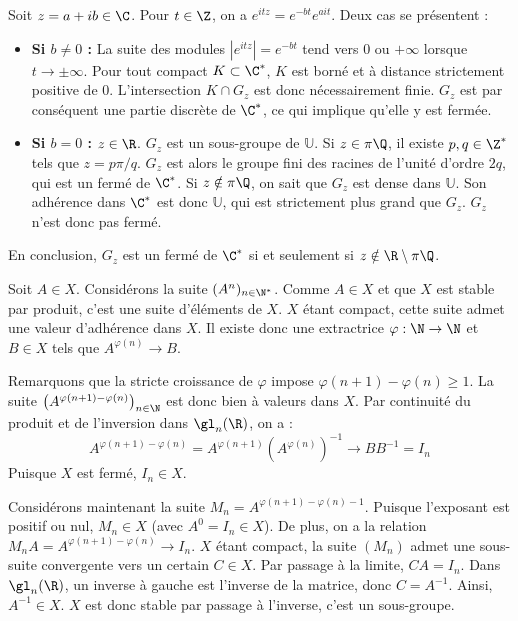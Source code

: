 \begin{solution}
    Soit $z=a+ib\in\C$. Pour $t\in\Z$, on a $e^{itz}=e^{-bt}e^{ait}$.
    Deux cas se présentent :
    \begin{itemize}
        \item \textbf{Si $b \neq 0$ :} La suite des modules $|e^{itz}| = e^{-bt}$ tend vers $0$ ou $+\infty$ lorsque $t \to \pm\infty$.
        Pour tout compact $K \subset \C^*$, $K$ est borné et à distance strictement positive de $0$. L'intersection $K \cap G_z$ est donc nécessairement finie. $G_z$ est par conséquent une partie discrète de $\C^*$, ce qui implique qu'elle y est fermée.
        \item \textbf{Si $b = 0$ :} $z \in \R$. $G_z$ est un sous-groupe de $\mathbb U$.
        Si $z \in \pi\Q$, il existe $p, q \in \Z^*$ tels que $z = p\pi/q$. $G_z$ est alors le groupe fini des racines de l'unité d'ordre $2q$, qui est un fermé de $\C^*$.
        Si $z \notin \pi\Q$, on sait que $G_z$ est dense dans $\mathbb U$. Son adhérence dans $\C^*$ est donc $\mathbb U$, qui est strictement plus grand que $G_z$. $G_z$ n'est donc pas fermé.
    \end{itemize}
    En conclusion, $G_z$ est un fermé de $\C^*$ si et seulement si $z \notin \R \setminus \pi\Q$.
\end{solution}

\begin{solution}
    Soit $A\in X$. Considérons la suite $(A^n)_{n\in\N^*}$.
    Comme $A\in X$ et que $X$ est stable par produit, c'est une suite d'éléments de $X$. 
    $X$ étant compact, cette suite admet une valeur d'adhérence dans $X$. Il existe donc une extractrice $\varphi : \N\to\N$ et $B\in X$ tels que $A^{\varphi(n)}\longrightarrow B$.
    
    Remarquons que la stricte croissance de $\varphi$ impose $\varphi(n+1) - \varphi(n) \geq 1$. La suite $\left(A^{\varphi(n+1)-\varphi(n)}\right)_{n\in\N}$ est donc bien à valeurs dans $X$.
    Par continuité du produit et de l'inversion dans $\gl_n(\R)$, on a :
    \[ 
        A^{\varphi(n+1)-\varphi(n)} = A^{\varphi(n+1)} \left(A^{\varphi(n)}\right)^{-1} \longrightarrow B B^{-1} = I_n 
    \]
    Puisque $X$ est fermé, $I_n \in X$.
    
    Considérons maintenant la suite $M_n = A^{\varphi(n+1)-\varphi(n)-1}$. Puisque l'exposant est positif ou nul, $M_n \in X$ (avec $A^0 = I_n \in X$).
    De plus, on a la relation $M_n A = A^{\varphi(n+1)-\varphi(n)} \longrightarrow I_n$.
    $X$ étant compact, la suite $(M_n)$ admet une sous-suite convergente vers un certain $C \in X$.
    Par passage à la limite, $C A = I_n$. Dans $\gl_n(\R)$, un inverse à gauche est l'inverse de la matrice, donc $C = A^{-1}$. Ainsi, $A^{-1} \in X$.
    $X$ est donc stable par passage à l'inverse, c'est un sous-groupe.
\end{solution}
     
